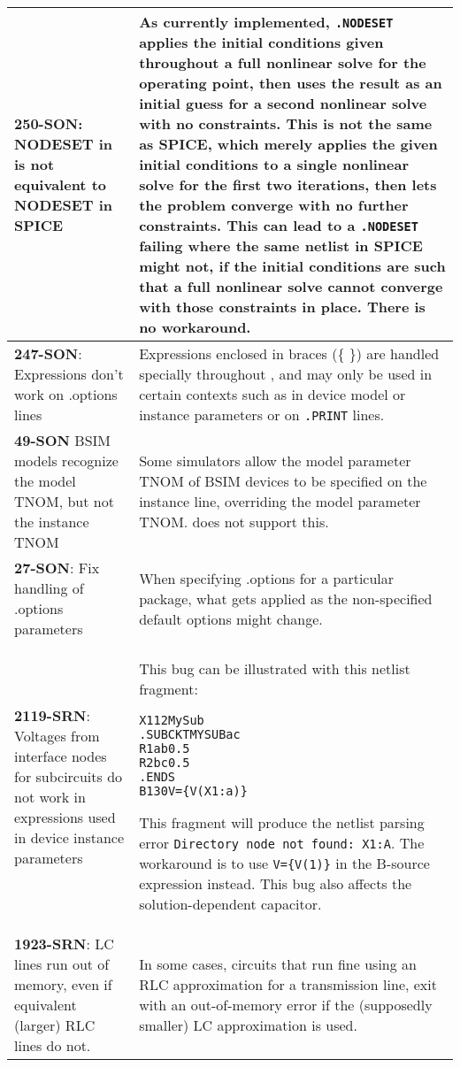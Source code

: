{\begin{longtable}[h] {>{\raggedright\small}m{2in}|>{\raggedright\let\\\tabularnewline\small}m{3.5in}}
\textbf{250-SON}: NODESET in \Xyce{} is not equivalent to NODESET in SPICE & As
currently implemented, \texttt{.NODESET} applies the initial
conditions given throughout a full nonlinear solve for the operating
point, then uses the result as an initial guess for a second nonlinear
solve with no constraints.  This is not the same as SPICE, which
merely applies the given initial conditions to a single nonlinear
solve for the first two iterations, then lets the problem converge
with no further constraints.  This can lead to
a \Xyce{} \texttt{.NODESET} failing where the same netlist in SPICE
might not, if the initial conditions are such that a full nonlinear
solve cannot converge with those constraints in place.  There is no
workaround.
\\ \hline

\textbf{247-SON}: Expressions don't work on .options lines & Expressions
enclosed in braces (\{ \}) are handled specially throughout \Xyce{},
and may only be used in certain contexts such as in device model or
instance parameters or on \texttt{.PRINT} lines.
\\ \hline


\textbf{49-SON} \Xyce{} BSIM models recognize the model TNOM, but not the
instance TNOM & Some simulators allow the model parameter TNOM of BSIM
devices to be specified on the instance line, overriding the model
parameter TNOM.  \Xyce{} does not support this.
\\ \hline


\textbf{27-SON}: Fix handling of .options parameters & When specifying .options
for a particular package, what gets applied as the non-specified
default options might change.  \\ \hline

\textbf{2119-SRN}: Voltages from interface nodes for subcircuits do not 
work in expressions used in device instance parameters & This bug can be
illustrated with this netlist fragment:
\begin{alltt}
X1 1 2 MySub
.SUBCKT MYSUB a c
R1   a b 0.5
R2   b c 0.5
.ENDS
B1 3 0 V=\{V(X1:a)\}
\end{alltt}
This fragment will produce the netlist parsing error \texttt{Directory 
node not found: X1:A}.  The workaround is to use \texttt{V=\{V(1)\}} 
in the B-source expression instead.  This bug also affects the 
solution-dependent capacitor.
\\ \hline

\textbf{1923-SRN}: LC lines run out of memory, even if equivalent (larger) RLC
lines do not. & In some cases, circuits that run fine using an RLC
approximation for a transmission line, exit with an out-of-memory
error if the (supposedly smaller) LC approximation is used.
\\ \hline


\end{longtable}}

